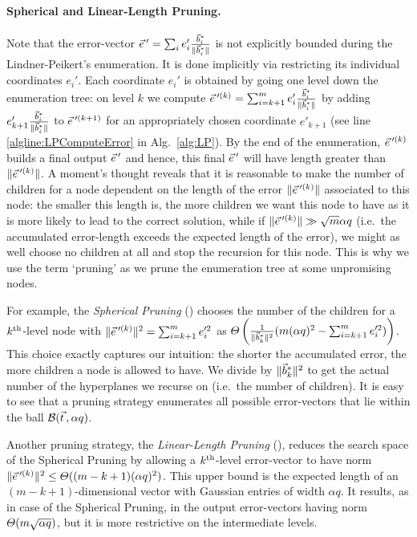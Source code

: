\paragraph{Spherical and Linear-Length Pruning.} 

Note that the error-vector $\evec' = \sum_i e_i' \frac{\wbvec_i}{ \| \wbvec_i \|}$ is not explicitly bounded during the Lindner-Peikert's enumeration. 
It is done implicitly via restricting its individual coordinates $e_i'$. Each coordinate $e_i'$ is obtained by going one level down the enumeration tree: on level $k$ we compute $\evec'^{(k)} = \sum_{i=k+1}^m e_i' \frac{\wbvec_i}{ \| \wbvec_i \|}$ by adding $e'_{k+1}\frac{\vec b^*_i}{ \| \vec b^*_i \|}$ to $\evec'^{(k+1)}$ for an appropriately chosen coordinate $e'_{k+1}$ (see line \ref{algline:LPComputeError} in Alg.~\ref{alg:LP}).
By the end of the enumeration, $\evec'^{(k)}$ builds a final output $\evec'$ and hence, this final $\evec'$ will have length greater than $\| \evec'^{(k)} \|$. 
A moment's thought reveals that it is reasonable to make the number of children for a node dependent on the length of the error $\| \evec'^{(k)} \|$ associated to this node: the smaller this length is, the more children we want this node to have as it is more likely to lead to the correct solution, while if $\| \evec'^{(k)} \| \gg \sqrt{m} \alpha q$ (i.e.\ the accumulated error-length exceeds the expected length of the \LWE error), we might as well choose no children at all and stop the recursion for this node. This is why we use the term `pruning' as we prune the enumeration tree at some unpromising nodes.

For example, the \emph{Spherical Pruning} (\cite{SchE94}) chooses the number of the children for a $k^{\mathrm{th}}$-level node with $\|\evec'^{(k)} \|^2 = \sum_{i=k+1}^m e_i'^2$ as $\varTheta  \left( \frac{1}{\| \vec b^*_k \|^2} ( m (\alpha q)^2 - \sum_{i=k+1}^m e_i'^2) \right)$. This choice exactly captures our intuition: the shorter the accumulated error, the more children a node is allowed to have. We divide by $ \| \vec b^*_k \|^2$ to get the actual number of the hyperplanes we recurse on (i.e.\ the number of children). It is easy to see that a pruning strategy enumerates all possible error-vectors that lie within the ball $\Ball(\tvec, \alpha q)$. 

Another pruning strategy, the \emph{Linear-Length Pruning} (\cite{EC:GamNguReg10}), reduces the search space of the Spherical Pruning by allowing a $k^{\mathrm{th}}$-level error-vector to have norm $\| \evec'^{(k)} \|^2 \leq \TLandau( (m-k+1) (\alpha q)^2)$. This upper bound is the expected length of an $(m-k+1)$-dimensional vector with Gaussian entries of width $\alpha q$. It results, as in case of the Spherical Pruning, in the output error-vectors having norm $\varTheta(m \sqrt{\alpha q})$, but it is more restrictive on the intermediate levels.

